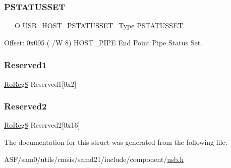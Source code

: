 \subsubsection{\texorpdfstring{PSTATUSSET}{PSTATUSSET}}
{\footnotesize\ttfamily \mbox{\hyperlink{core__cm0plus_8h_a7e25d9380f9ef903923964322e71f2f6}{\+\_\+\+\_\+O}} \mbox{\hyperlink{union_u_s_b___h_o_s_t___p_s_t_a_t_u_s_s_e_t___type}{U\+S\+B\+\_\+\+H\+O\+S\+T\+\_\+\+P\+S\+T\+A\+T\+U\+S\+S\+E\+T\+\_\+\+Type}} P\+S\+T\+A\+T\+U\+S\+S\+ET}



Offset\+: 0x005 ( /W 8) H\+O\+S\+T\+\_\+\+P\+I\+PE End Point Pipe Status Set. 

\mbox{\label{struct_usb_host_pipe_a3e42d171d4eb8eda7a030a3453f2d9c0}} 
\subsubsection{\texorpdfstring{Reserved1}{Reserved1}}
{\footnotesize\ttfamily \mbox{\hyperlink{group___s_a_m_d21_e15_a__definitions_ga0d957f1433aaf5d70e4dc2b68288442d}{Ro\+Reg8}} Reserved1\mbox{[}0x2\mbox{]}}

\mbox{\label{struct_usb_host_pipe_ae1a87a5a7a573aef81319e37b8a8e3d3}} 
\subsubsection{\texorpdfstring{Reserved2}{Reserved2}}
{\footnotesize\ttfamily \mbox{\hyperlink{group___s_a_m_d21_e15_a__definitions_ga0d957f1433aaf5d70e4dc2b68288442d}{Ro\+Reg8}} Reserved2\mbox{[}0x16\mbox{]}}



The documentation for this struct was generated from the following file\+:\begin{DoxyCompactItemize}
\item 
A\+S\+F/sam0/utils/cmsis/samd21/include/component/\mbox{\hyperlink{component_2usb_8h}{usb.\+h}}\end{DoxyCompactItemize}
